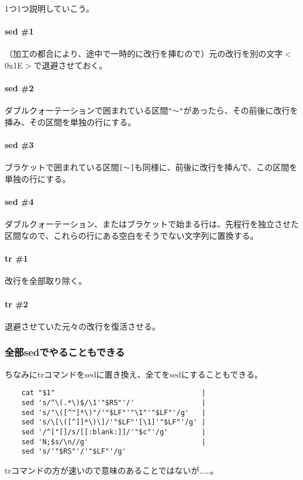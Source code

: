 1つ1つ説明していこう。

\paragraph{sed \#1}
（加工の都合により、途中で一時的に改行を挿むので）元の改行を別の文字$<$0x1E$>$で退避させておく。

\paragraph{sed \#2}
ダブルクォーテーションで囲まれている区間\verb|"～"|があったら、その前後に改行を挿み、その区間を単独の行にする。

\paragraph{sed \#3}
ブラケットで囲まれている区間\verb|[～]|も同様に、前後に改行を挿んで、この区間を単独の行にする。

\paragraph{sed \#4}
ダブルクォーテーション、またはブラケットで始まる行は、先程行を独立させた区間なので、これらの行にある空白をそうでない文字列に置換する。

\paragraph{tr \#1}
改行を全部取り除く。

\paragraph{tr \#2}
退避させていた元々の改行を復活させる。

\subsubsection*{全部sedでやることもできる}

ちなみにtrコマンドをsedに置き換え、全てをsedにすることもできる。\\
\begin{frameboxit}{160.0mm}
\begin{verbatim}
	cat "$1"                                   |
	sed 's/^\(.*\)$/\1'"$RS"'/'                |
	sed 's/"\([^"]*\)"/'"$LF"'"\1"'"$LF"'/g'   |
	sed 's/\[\([^]]*\)\]/'"$LF"'[\1]'"$LF"'/g' |
	sed '/^["[]/s/[[:blank:]]/'"$c"'/g'        |
	sed 'N;$s/\n//g'                           |
	sed 's/'"$RS"'/'"$LF"'/g'
\end{verbatim}
\end{frameboxit}
trコマンドの方が速いので意味のあることではないが……。

